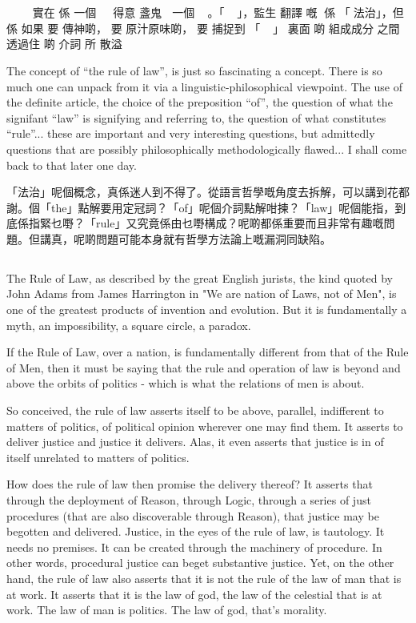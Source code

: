 \chapter{}
 󱝚  󰳙，實在 係 一個 󱭱󱸙󱏡 得意 盞鬼 󱝚 一個 。「」，監生 翻譯 嘅 󱁚係 「法治」，但係 如果 要 傳神啲， 要 原汁原味啲， 要 捕捉到 「」 裏面 啲 組成成分 之間 透過住 啲 介詞 所 散溢 

The concept of “the rule of law”, is just so fascinating a concept. There is so much one can unpack from it via a linguistic-philosophical viewpoint. The use of the definite article, the choice of the preposition “of”, the question of what the signifant “law” is signifying and referring to, the question of what constitutes “rule”... these are important and very interesting questions, but admittedly questions that are possibly philosophically methodologically flawed... I shall come back to that later one day. 

「法治」呢個概念，真係迷人到不得了。從語言哲學嘅角度去拆解，可以講到花都謝。個「the」點解要用定冠詞？「of」呢個介詞點解咁揀？「law」呢個能指，到底係指緊乜嘢？「rule」又究竟係由乜嘢構成？呢啲都係重要而且非常有趣嘅問題。但講真，呢啲問題可能本身就有哲學方法論上嘅漏洞同缺陷。

\section{}
The Rule of Law, as described by the great English jurists, the kind quoted by John Adams from James Harrington in "We are nation of Laws, not of Men", is one of the greatest products of invention and evolution. But it is fundamentally a myth, an impossibility, a square circle, a paradox. 

If the Rule of Law, over a nation, is fundamentally different from that of the Rule of Men, then it must be saying that the rule and operation of law is beyond and above the orbits of politics - which is what the relations of men is about.

So conceived, the rule of law asserts itself to be above, parallel, indifferent to matters of politics, of political opinion wherever one may find them. It asserts to deliver justice and justice it delivers. Alas, it even asserts that justice is in of itself unrelated to matters of politics. 

How does the rule of law then promise the delivery thereof? It asserts that through the deployment of Reason, through Logic, through a series of just procedures (that are also discoverable through Reason), that justice may be begotten and delivered. Justice, in the eyes of the rule of law, is tautology. It needs no premises. It can be created through the machinery of procedure. In other words, procedural justice can beget substantive justice. Yet, on the other hand, the rule of law also asserts that it is not the rule of the law of man that is at work. It asserts that it is the law of god, the law of the celestial that is at work. The law of man is politics. The law of god, that’s morality. 

